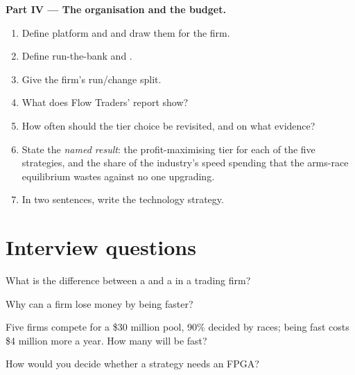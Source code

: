 \begin{problem}
\medskip\noindent\textbf{Part IV --- The organisation and the budget.}
\begin{enumerate}[resume]
\item Define platform and  and draw them for the firm.
\item Define run-the-bank and .
\item Give the firm's run/change split.
\item What does Flow Traders' report show?
\item How often should the tier choice be revisited, and on what evidence?
\item State the \emph{named result}: the profit-maximising tier for each of the five strategies, and the share of the industry's speed spending that
the arms-race equilibrium wastes against no one upgrading.
\item In two sentences, write the technology strategy.
\end{enumerate}
\end{problem}

\section{Interview questions}

\begin{interviewq}\label{iq:fm:technology-strategy:1}
What is the difference between a  and a  in a trading firm?
\end{interviewq}

\begin{interviewq}\label{iq:fm:technology-strategy:2}
Why can a firm lose money by being faster?
\end{interviewq}

\begin{interviewq}\label{iq:fm:technology-strategy:3}
Five firms compete for a \$30 million pool, 90\% decided by races; being fast costs \$4 million more a year. How many will be fast?
\end{interviewq}

\begin{interviewq}\label{iq:fm:technology-strategy:4}
How would you decide whether a strategy needs an FPGA?
\end{interviewq}

